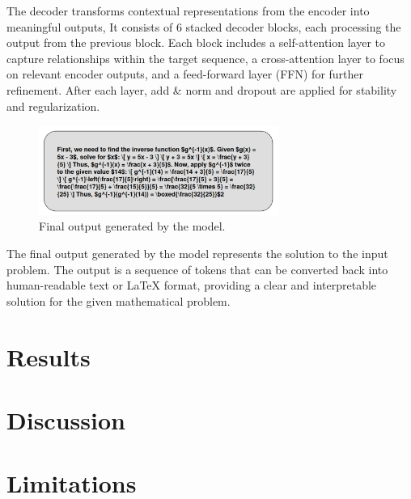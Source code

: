 \documentclass{article}
\begin{document}
The decoder transforms contextual representations from the encoder into meaningful outputs, It consists of 6 stacked decoder blocks, each processing the output from the previous block. Each block includes a self-attention layer to capture relationships within the target sequence, a cross-attention layer to focus on relevant encoder outputs, and a feed-forward layer (FFN) for further refinement. After each layer, add \& norm and dropout are applied for stability and regularization.

\begin{figure}[htbp]
  \centering
  \includegraphics[width=0.7\textwidth]{./figures/output.png}
  \caption{Final output generated by the model.}
  \label{fig:output}
\end{figure}

The final output generated by the model represents the solution to the input problem. The output is a sequence of tokens that can be converted back into human-readable text or LaTeX format, providing a clear and interpretable solution for the given mathematical problem.


\section{Results}


\section{Discussion}


\section{Limitations}
\end{document}
